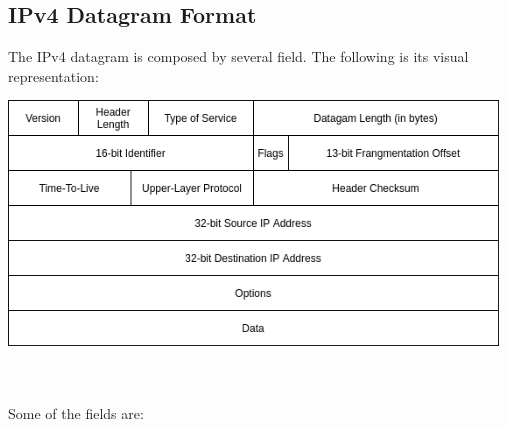 \documentclass{article}
\begin{document}
\subsection{IPv4 Datagram Format}
The IPv4 datagram is composed by several field. The following is its visual representation: \\
\centerline{\includegraphics[width=13cm]{./assets/ipv4_datagram.png}} \\ \\ 
Some of the fields are:
\end{document}
